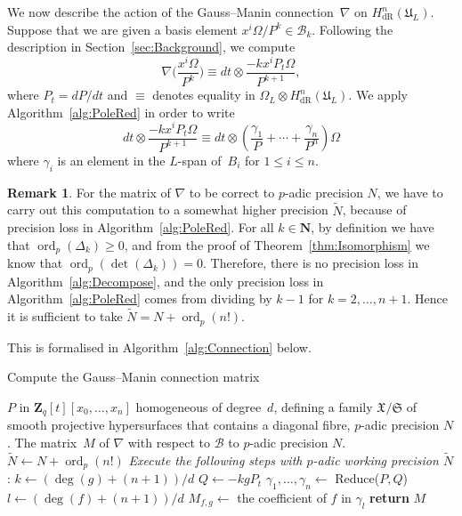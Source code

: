 \documentclass[a4paper,11pt]{article}
\numberwithin{equation}{section}
\newcommand{\NN}{\mathbf{N}} %
\newcommand{\ZZ}{\mathbf{Z}} %
\DeclareMathOperator{\ord}{ord}          %
\providecommand{\HdR}{H_{\text{dR}}}    %
\providecommand{\cB}{\mathcal{B}} %
\theoremstyle{definition}
\newtheorem{rem}[thm]{Remark}
\begin{document}
We now describe the action of the Gauss--Manin connection~$\nabla$ on 
$\HdR^n(\mathfrak{U}_L)$.  Suppose that we are given a basis element 
$x^i \Omega / P^k \in \cB_k$.  Following the description in 
Section~\ref{sec:Background}, we compute
\begin{equation} \label{eqn:nabla}
\nabla \biggl(\frac{x^i \Omega}{P^k}\biggr) \equiv 
dt \otimes \frac{- k x^i P_t \Omega}{P^{k+1}},
\end{equation}
where $P_t = dP/dt$ and $\equiv$ denotes equality in 
$\Omega_{L} \otimes \HdR^n(\mathfrak{U}_L)$. We apply 
Algorithm~\ref{alg:PoleRed} in order to write
\begin{equation}
dt \otimes \frac{- k x^i P_t \Omega}{P^{k+1}} \equiv 
dt \otimes \left( \frac{\gamma_{1}}{P} + \dotsb + \frac{\gamma_n}{P^n} \right) \Omega
\end{equation}
where $\gamma_i$ is an element in the $L$-span of~$B_i$ for $1 \leq i \leq n$. 

\begin{rem} \label{rem:precgm}
For the matrix of $\nabla$ to be correct to $p$-adic precision $N$, we have to 
carry out this computation to a somewhat higher precision $\tilde{N}$, because of 
precision loss in Algorithm~\ref{alg:PoleRed}. 
For all $k \in \NN$, by definition we have that $\ord_p(\Delta_k) \geq 0$, and from the proof
of Theorem~\ref{thm:Isomorphism} we know that $\ord_p(\det(\Delta_k))=0$. 
Therefore, there is no precision loss 
in Algorithm~\ref{alg:Decompose}, and the only precision loss in Algorithm~\ref{alg:PoleRed} 
comes from dividing by $k-1$ for $k=2,\dotsc,n+1$. Hence it is sufficient to take 
$\tilde{N}=N + \ord_p(n!)$.
\end{rem}

This is formalised in Algorithm~\ref{alg:Connection} below.

\begin{algorithm}
\caption{Compute the Gauss--Manin connection matrix}
\label{alg:Connection}
\begin{algorithmic}
\Require $P$ in $\ZZ_q[t][x_0, \dotsc, x_n]$ homogeneous of degree~$d$, 
         defining a family $\mathfrak{X}/\mathfrak{S}$ of smooth projective 
         hypersurfaces that contains a diagonal fibre, $p$-adic precision $N$.
\Ensure  The matrix~$M$ of $\nabla$ with respect to $\cB$ to $p$-adic precision $N$.
\State $\tilde{N} \gets N + \ord_p(n!)$
\State \textit{Execute the following steps with $p$-adic working precision $\tilde{N}$}:
\State $k \gets  (\deg(g)+(n+1))/d$
\State $Q \gets  - k g P_t$ 
\State $\gamma_{1}, \dotsc, \gamma_n \gets$
      {\sc Reduce($P,Q$)} 
\State $l \gets (\deg(f)+(n+1))/d$
\State $M_{f,g} \gets$ the coefficient of $f$ in $\gamma_l$
\EndFor
\EndFor
\textbf{return} $M$
\EndProcedure
\end{algorithmic}
\end{algorithm}
\end{document}
